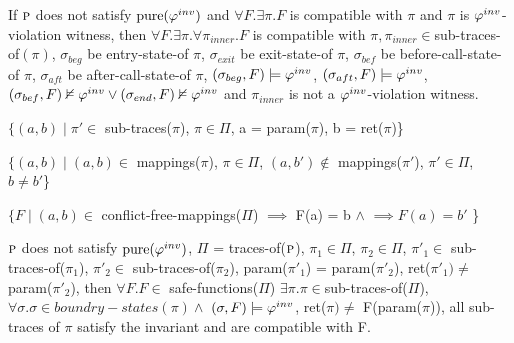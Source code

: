 \documentclass{llncs}
\begin{document}
\begin{lemma}
  If
  $\textsc{p}$ does not satisfy $\mathrm{pure}(\varphi^{inv})$ and 
  $\forall F. \exists \pi. F$ is compatible with $\pi$ and $\pi$ is
  $\varphi^{inv}$-violation witness,
  then $\forall F. \exists \pi. \forall \pi_{inner}. F$ is compatible
  with $\pi, \pi_{inner} \in $sub-traces-of$(\pi)$,
  $\sigma_{beg}$ be entry-state-of $\pi$,
  $\sigma_{exit}$ be exit-state-of $\pi$,
  $\sigma_{bef}$ be before-call-state-of $\pi$,
  $\sigma_{aft}$ be after-call-state-of $\pi$,
  $(\sigma_{beg}, F) \models \varphi^{inv}$,
  $(\sigma_{aft}, F) \models \varphi^{inv}$,
  $(\sigma_{bef}, F) \nvDash \varphi^{inv} \vee (\sigma_{end}, F) \nvDash\varphi^{inv}$
  and $\pi_{inner}$ is not a $\varphi^{inv}$-violation witness.
\end{lemma}

\begin{definition}
  $\{(a,b) \mid \pi' \in$ sub-traces($\pi$), $\pi \in \Pi$, a =
  param($\pi$), b = ret($\pi$)\} 
\end{definition}

\begin{definition}
  $\{(a,b) \mid (a,b) \in $ mappings($\pi$),
  $\pi \in \Pi$,
  $(a, b') \not \in$ mappings($\pi'$),
  $\pi' \in \Pi$, 
  $b \neq b'$\}
\end{definition}

\begin{definition}
  $\{F  \mid (a,b) \in$ conflict-free-mappings($\Pi$)
  $\implies$ F(a) = b $\wedge$
  $ \implies F(a) = b'$
  \}
\end{definition}

\begin{lemma}
  $\textsc{p}$ does not satisfy $\mathrm{pure}(\varphi^{inv})$, $\Pi$ = traces-of($\textsc{p}$),
  $\pi_1 \in \Pi$,
  $\pi_2 \in \Pi$,
  $\pi'_1 \in$ sub-traces-of($\pi_1$),
  $\pi'_2 \in$ sub-traces-of($\pi_2$),
  param($\pi'_1$) = param($\pi'_2$),
  ret($\pi'_1) \neq$ param($\pi'_2$),
  then
  $\forall F. F \in$ safe-functions($\Pi$) $\exists \pi. \pi \in $sub-traces-of($\Pi$),
  $\forall \sigma. \sigma \in boundry-states(\pi) \wedge$
  $(\sigma, F) \models \varphi^{inv}$,
  ret($\pi) \neq$ F(param($\pi$)),
  all sub-traces of $\pi$ satisfy the invariant and are compatible
  with F.
\end{lemma}
\end{document}

